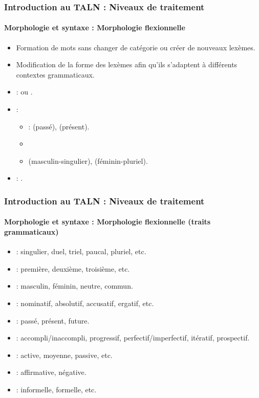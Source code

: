 \documentclass[xcolor=table]{beamer}
\begin{document}
\begin{frame}
\frametitle{Introduction au TALN : Niveaux de traitement}
\framesubtitle{Morphologie et syntaxe : Morphologie flexionnelle}

\begin{itemize}
	\item Formation de mots sans changer de catégorie ou créer de nouveaux lexèmes.
	\item Modification de la forme des lexèmes afin qu'ils s'adaptent à différents contextes grammaticaux.
	\item {} :  ou .
	\item {} :
	\begin{itemize}
		\item {} :  (passé),  (présent).
		\item {}
		\item {}  (masculin-singulier),  (féminin-pluriel).
	\end{itemize}
	\item {} : .
	
\end{itemize}


\end{frame}

\begin{frame}
\frametitle{Introduction au TALN : Niveaux de traitement}
\framesubtitle{Morphologie et syntaxe : Morphologie flexionnelle (traits grammaticaux)}

\begin{itemize}
	\item {} : singulier, duel, triel, paucal, pluriel, etc. 
	\item {} : première, deuxième, troisième, etc.
	\item {} : masculin, féminin, neutre, commun.
	\item {} : nominatif, absolutif, accusatif, ergatif, etc.
	\item {} : passé, présent, future.
	\item {} : accompli/inaccompli, progressif, perfectif/imperfectif, itératif, prospectif.
	\item {} : active, moyenne, passive, etc.
	\item {} : affirmative, négative.
	\item {} : informelle, formelle, etc.
\end{itemize}

\end{frame}
\end{document}
